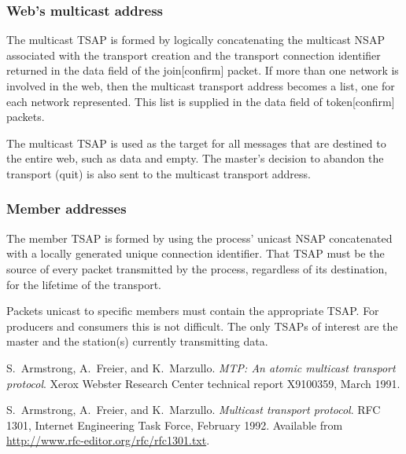 \documentclass[11pt]{article}
\begin{document}
\subsubsection{Web's multicast address}

   The multicast TSAP is formed by logically concatenating the multicast
   NSAP associated with the transport creation and the transport
   connection identifier returned in the data field of the join[confirm]
   packet. If more than one network is involved in the web, then the
   multicast transport address becomes a list, one for each network
   represented.  This list is supplied in the data field of
   token[confirm] packets.

   The multicast TSAP is used as the target for all messages that are
   destined to the entire web, such as data and empty. The master's
   decision to abandon the transport (quit) is also sent to the
   multicast transport address.

\subsubsection{Member addresses}

   The member TSAP is formed by using the process' unicast NSAP
   concatenated with a locally generated unique connection identifier.
   That TSAP must be the source of every packet transmitted by the
   process, regardless of its destination, for the lifetime of the
   transport.

   Packets unicast to specific members must contain the appropriate
   TSAP\@.  For producers and consumers this is not difficult. The only
   TSAPs of interest are the master and the station(s) currently
   transmitting data.





\begin{thebibliography}{AFM91}
S.~Armstrong, A.~Freier, and K.~Marzullo.
\emph{MTP: An atomic multicast transport protocol}.
Xerox Webster Research Center technical report X9100359,
March 1991.

S.~Armstrong, A.~Freier, and K.~Marzullo.
\emph{Multicast transport protocol}.
RFC 1301, Internet Engineering Task Force, February 1992.
Available from \url{http://www.rfc-editor.org/rfc/rfc1301.txt}.
\end{thebibliography}
\end{document}
